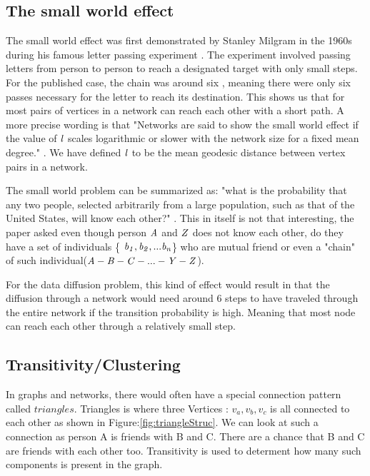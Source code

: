 \subsection{The small world effect}\label{sec:SmallWorldeffect}

The small world effect was first demonstrated by Stanley Milgram in the 1960s during his famous letter passing experiment \cite{SmallWorldProblemSmilgram1960}. The experiment involved passing letters from person to person to reach a designated target with only small steps. For the published case, the chain was around six  \cite{Experiment1969}, meaning there were only six passes necessary for the letter to reach its destination. This shows us that for most pairs of vertices in a network can reach each other with a short path. A more precise wording is that "Networks are said to show the small world effect if the value of $\it{l}$ scales logarithmic or slower with the network size for a fixed mean degree." \cite{ComplexNetwork2003}. We have defined $\it{l} $ to be the mean geodesic distance between vertex pairs in a network.

The small world problem can be summarized as: "what is the probability that any two people, selected arbitrarily from a large population, such as that of the United States, will know each other?" \cite{worldExperiment1969}. This in itself is not that interesting, the paper \cite{worldExperiment1969} asked even though  person $\it{A}$ and $\it{Z}$ does not know each other, do they have a set of individuals \{ $\it {b_1, b_2, ... b_n} $\} who are mutual friend or even a "chain" of such individual($\it {A-B-C-...-Y-Z}$).

For the data diffusion problem, this kind of effect would result in that the diffusion through a network would need around 6 steps to have traveled through the entire network if the transition probability is high. Meaning that most node can reach each other through a relatively small step.

\subsection{Transitivity/Clustering}
In graphs and networks, there would often have a special connection pattern called $triangles$. Triangles is where three Vertices : $v_a,v_b,v_c$ is all connected to each other as shown in Figure:\ref{fig:triangleStruc}. We can look at such a connection as person A is friends with B and C. There are a chance that B and C are friends with each other too. Transitivity is used to determent how many such components is present in the graph.  

